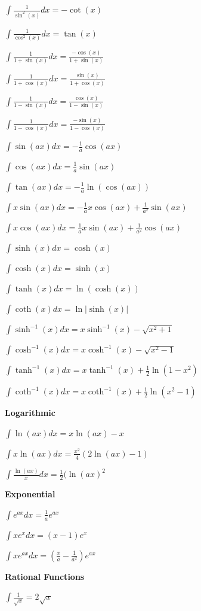 \documentclass[8pt,a4paper]{extarticle}     %
\theoremstyle{definition}
\theoremstyle{definition}
\theoremstyle{definition}
\begin{document}
\begin{multicols}{4}
\begin{bulletlist}
	\item $\int \frac{1}{\sin^2(x)}dx = -\cot(x)$
	\item $\int \frac{1}{\cos^2(x)}dx = \tan(x)$
	\item $\int \frac{1}{1+\sin(x)}dx = \frac{-\cos(x)}{1+\sin(x)}$
	\item $\int \frac{1}{1+\cos(x)}dx = \frac{\sin(x)}{1+\cos(x)}$
	\item $\int \frac{1}{1-\sin(x)}dx = \frac{\cos(x)}{1-\sin(x)}$
	\item $\int \frac{1}{1-\cos(x)}dx = \frac{-\sin(x)}{1-\cos(x)}$
	\item $\int \sin(ax)dx = -\frac{1}{a}\cos(ax)$
	\item $\int \cos(ax)dx = \frac{1}{a}\sin(ax)$
	\item $\int \tan(ax)dx = -\frac{1}{a}\ln(\cos(ax))$
	\item $\int x\sin(ax)dx = -\frac{1}{a}x\cos(ax)+\frac{1}{a^2}\sin(ax)$
	\item $\int x\cos(ax)dx = \frac{1}{a}x\sin(ax)+\frac{1}{a^2}\cos(ax)$
	\item $\int \sinh(x) dx = \cosh(x)$
	\item $\int \cosh(x) dx = \sinh(x)$
	\item $\int \tanh(x) dx = \ln(\cosh(x))$
	\item $\int \coth(x) dx = \ln|\sinh(x)|$
	\item $\int \sinh^{-1}(x) dx = x\sinh^{-1}(x) - \sqrt{x^2+1}$
	\item $\int \cosh^{-1}(x) dx = x\cosh^{-1}(x) - \sqrt{x^2-1}$
	\item $\int \tanh^{-1}(x) dx = x\tanh^{-1}(x) + \frac{1}{2}\ln(1-x^2)$
	\item $\int \coth^{-1}(x) dx = x\coth^{-1}(x) + \frac{1}{2}\ln(x^2-1)$
	\item [] \textbf{Logarithmic}
	\item $\int \ln(ax)dx = x\ln(ax)-x$
	\item $\int x\ln(ax)dx = \frac{x^2}{4}(2\ln(ax)-1)$
	\item $\int \frac{\ln(ax)}{x}dx = \frac{1}{2}(\ln(ax)^2$
	\item [] \textbf{Exponential}
	\item $\int e^{ax}dx = \frac{1}{a}e^{ax}$
	\item $\int xe^x dx = (x-1)e^x$
	\item $\int xe^{ax}dx = \left(\frac{x}{a}-\frac{1}{a^2}\right)e^{ax}$
	\item [] \textbf{Rational Functions}
	\item $\int \frac{1}{\sqrt{x}} = 2\sqrt{x}$

\end{bulletlist}
\end{multicols}
\end{document}
